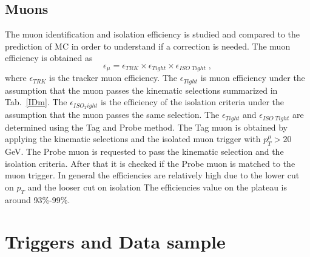 \subsection*{Muons} 
The muon identification and isolation efficiency is studied and compared to the prediction of MC in order
to understand if a correction is needed. The muon efficiency is obtained as
\begin{equation}
\epsilon_{\mu} = \epsilon_{TRK} \times \epsilon_{Tight} \times \epsilon_{ISO \; Tight} \; ,
\end{equation}
\newline
where $ \epsilon_{TRK}$ is the tracker  muon efficiency.  
The $ \epsilon_{Tight} $ is muon efficiency
under the assumption that the muon passes the kinematic selections summarized in  Tab.~\ref{IDm}.
The $\epsilon_{ISO_Tight}$ is the efficiency of the isolation criteria under the assumption that the muon passes the same selection.
The $\epsilon_{Tight}$ and $ \epsilon_{ISO \; Tight}$ are determined  using the Tag and Probe method. 
The Tag muon is obtained by applying  the kinematic selections  and   the isolated muon trigger  with $p_T^{\mu}>20$ GeV.
The Probe muon  is requested to pass the kinematic selection and the isolation criteria.
After that it is checked if the Probe muon is matched to the muon trigger. 
In general the efficiencies are relatively high due to the lower cut on $p_T$ and the looser cut on
isolation %
The efficiencies value on the plateau is around 93\%-99\%.



\section{Triggers and Data sample}


